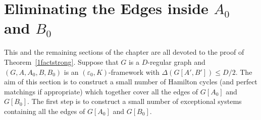 \documentclass{memo-l}
\def\eps{\varepsilon}
\def\epszero{\eps_0}
\numberwithin{section}{chapter}
\numberwithin{equation}{section}
\numberwithin{firstthm}{section}
\numberwithin{figure}{section}
\begin{document}
\section{Eliminating the Edges inside $A_0$ and $B_0$}\label{sec:V_0}

This and the remaining sections of the chapter are all devoted to the proof of Theorem~\ref{1factstrong}.
Suppose that $G$ is a $D$-regular graph and $(G,A,A_0,B,B_0)$ is an $(\epszero,K)$-framework with $\Delta (G[A',B']) \le D/2$.
The aim of this section is to construct a small number of Hamilton cycles 
(and perfect matchings if appropriate) which together cover all the edges of $G[A_0]$ and $G[B_0]$.
The first step is to construct a small number of exceptional systems containing all the edges of $G[A_0]$ and $G[B_0]$.
\end{document}
